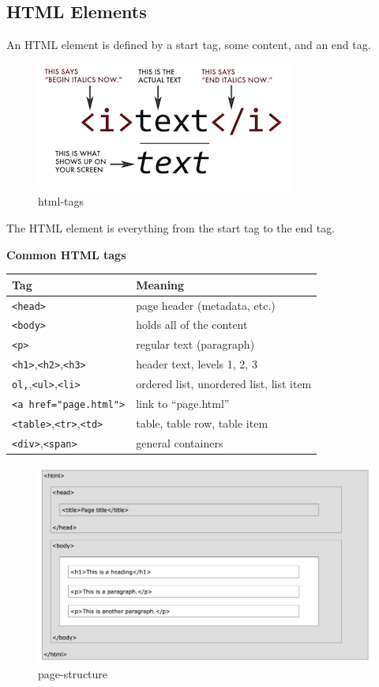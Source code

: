 \documentclass[
]{book}
\begin{document}
\hypertarget{html-elements}{%
\subsection{HTML Elements}\label{html-elements}}

An HTML element is defined by a start tag, some content, and an end tag.

\begin{figure}
\centering
\includegraphics{img/html-tags.png}
\caption{html-tags}
\end{figure}

The HTML element is everything from the start tag to the end tag.

\textbf{Common HTML tags}

\begin{longtable}[]{@{}ll@{}}
\toprule
Tag & Meaning\tabularnewline
\midrule
\endhead
\texttt{\textless{}head\textgreater{}} & page header (metadata, etc.)\tabularnewline
\texttt{\textless{}body\textgreater{}} & holds all of the content\tabularnewline
\texttt{\textless{}p\textgreater{}} & regular text (paragraph)\tabularnewline
\texttt{\textless{}h1\textgreater{}},\texttt{\textless{}h2\textgreater{}},\texttt{\textless{}h3\textgreater{}} & header text, levels 1, 2, 3\tabularnewline
\texttt{ol,},\texttt{\textless{}ul\textgreater{}},\texttt{\textless{}li\textgreater{}} & ordered list, unordered list, list item\tabularnewline
\texttt{\textless{}a\ href="page.html"\textgreater{}} & link to ``page.html''\tabularnewline
\texttt{\textless{}table\textgreater{}},\texttt{\textless{}tr\textgreater{}},\texttt{\textless{}td\textgreater{}} & table, table row, table item\tabularnewline
\texttt{\textless{}div\textgreater{}},\texttt{\textless{}span\textgreater{}} & general containers\tabularnewline
\bottomrule
\end{longtable}

\begin{figure}
\centering
\includegraphics{img/page-structure.png}
\caption{page-structure}
\end{figure}
\end{document}
